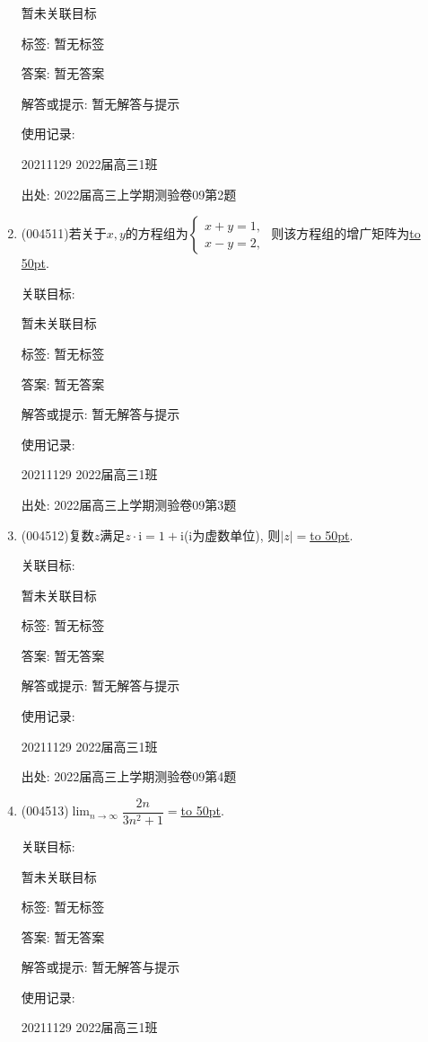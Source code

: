 \documentclass[10pt,a4paper]{article}
\newcommand{\blank}[1]{\underline{\hbox to #1pt{}}}
\begin{document}
\begin{enumerate}[1.]
暂未关联目标



标签: 暂无标签

答案: 暂无答案

解答或提示: 暂无解答与提示

使用记录:

20211129	2022届高三1班	


出处: 2022届高三上学期测验卷09第2题
\item { (004511)}若关于$x,y$的方程组为$\begin{cases} x+y=1,  \\ x-y=2,  \end{cases}$ 则该方程组的增广矩阵为\blank{50}.


关联目标:

暂未关联目标



标签: 暂无标签

答案: 暂无答案

解答或提示: 暂无解答与提示

使用记录:

20211129	2022届高三1班	


出处: 2022届高三上学期测验卷09第3题
\item { (004512)}复数$z$满足$z\cdot \mathrm{i}=1+\mathrm{i}$($\mathrm{i}$为虚数单位), 则$|z|=$\blank{50}.


关联目标:

暂未关联目标



标签: 暂无标签

答案: 暂无答案

解答或提示: 暂无解答与提示

使用记录:

20211129	2022届高三1班	


出处: 2022届高三上学期测验卷09第4题
\item { (004513)}$\displaystyle\lim_{n\to \infty}\dfrac{2n}{3{n^2}+1}=$\blank{50}.


关联目标:

暂未关联目标



标签: 暂无标签

答案: 暂无答案

解答或提示: 暂无解答与提示

使用记录:

20211129	2022届高三1班	



\end{enumerate}
\end{document}
